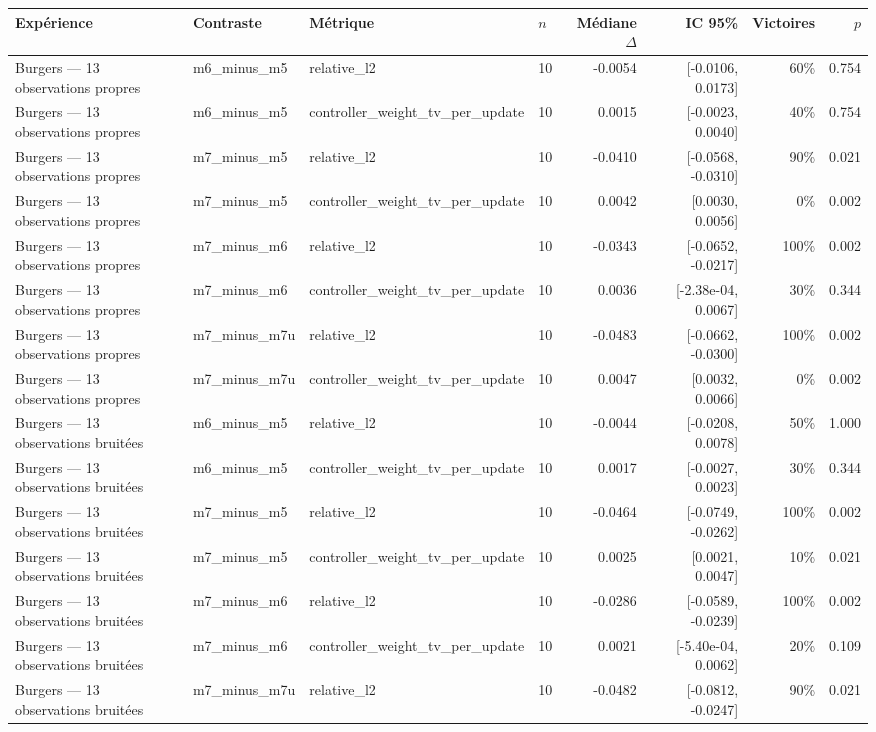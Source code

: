 \begin{tabular}{llllrrrr}
\toprule
Expérience & Contraste & Métrique & $n$ & Médiane $\Delta$ & IC 95\% & Victoires & $p$ \\
\midrule
Burgers — 13 observations propres & m6\_minus\_m5 & relative\_l2 & 10 & -0.0054 & [-0.0106, 0.0173] & 60\% & 0.754 \\
Burgers — 13 observations propres & m6\_minus\_m5 & controller\_weight\_tv\_per\_update & 10 & 0.0015 & [-0.0023, 0.0040] & 40\% & 0.754 \\
Burgers — 13 observations propres & m7\_minus\_m5 & relative\_l2 & 10 & -0.0410 & [-0.0568, -0.0310] & 90\% & 0.021 \\
Burgers — 13 observations propres & m7\_minus\_m5 & controller\_weight\_tv\_per\_update & 10 & 0.0042 & [0.0030, 0.0056] & 0\% & 0.002 \\
Burgers — 13 observations propres & m7\_minus\_m6 & relative\_l2 & 10 & -0.0343 & [-0.0652, -0.0217] & 100\% & 0.002 \\
Burgers — 13 observations propres & m7\_minus\_m6 & controller\_weight\_tv\_per\_update & 10 & 0.0036 & [-2.38e-04, 0.0067] & 30\% & 0.344 \\
Burgers — 13 observations propres & m7\_minus\_m7u & relative\_l2 & 10 & -0.0483 & [-0.0662, -0.0300] & 100\% & 0.002 \\
Burgers — 13 observations propres & m7\_minus\_m7u & controller\_weight\_tv\_per\_update & 10 & 0.0047 & [0.0032, 0.0066] & 0\% & 0.002 \\
Burgers — 13 observations bruitées & m6\_minus\_m5 & relative\_l2 & 10 & -0.0044 & [-0.0208, 0.0078] & 50\% & 1.000 \\
Burgers — 13 observations bruitées & m6\_minus\_m5 & controller\_weight\_tv\_per\_update & 10 & 0.0017 & [-0.0027, 0.0023] & 30\% & 0.344 \\
Burgers — 13 observations bruitées & m7\_minus\_m5 & relative\_l2 & 10 & -0.0464 & [-0.0749, -0.0262] & 100\% & 0.002 \\
Burgers — 13 observations bruitées & m7\_minus\_m5 & controller\_weight\_tv\_per\_update & 10 & 0.0025 & [0.0021, 0.0047] & 10\% & 0.021 \\
Burgers — 13 observations bruitées & m7\_minus\_m6 & relative\_l2 & 10 & -0.0286 & [-0.0589, -0.0239] & 100\% & 0.002 \\
Burgers — 13 observations bruitées & m7\_minus\_m6 & controller\_weight\_tv\_per\_update & 10 & 0.0021 & [-5.40e-04, 0.0062] & 20\% & 0.109 \\
Burgers — 13 observations bruitées & m7\_minus\_m7u & relative\_l2 & 10 & -0.0482 & [-0.0812, -0.0247] & 90\% & 0.021 \\

\end{tabular}

